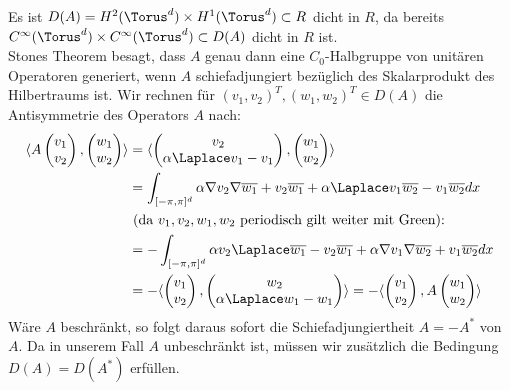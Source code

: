 Es ist $D(A)=H^2(\Torus^d)\times H^1(\Torus^d)\subset R$ dicht in $R$, da bereits $C^\infty(\Torus^d)\times C^\infty(\Torus^d)\subset D(A)$ dicht in $R$ ist.\\
Stones Theorem besagt, dass $A$ genau dann eine $C_0$-Halbgruppe von unitären Operatoren generiert, wenn $A$ schiefadjungiert bezüglich des Skalarprodukt des Hilbertraums ist. Wir rechnen für $(v_1,v_2)^T, (w_1,w_2)^T\in D(A)$ die Antisymmetrie des Operators $A$ nach:
\begin{align*}
\langle A\begin{pmatrix}v_1\\v_2\end{pmatrix}, \begin{pmatrix}w_1\\w_2\end{pmatrix}\rangle
&=\langle \begin{pmatrix} v_2\\\alpha \Laplace v_1-v_1\end{pmatrix}, \begin{pmatrix}w_1\\w_2\end{pmatrix}\rangle\\
&=\int_{[-\pi,\pi]^d} \alpha \nabla v_2\nabla \overline{w_1} +v_2\overline{w_1}+ \alpha \Laplace v_1 \overline{w_2} - v_1\overline{w_2}dx\\
&\text{ (da $v_1,v_2,w_1,w_2$ periodisch gilt weiter mit Green):}\\
&=-\int_{[-\pi,\pi]^d}\alpha v_2\Laplace \overline{w_1}-v_2\overline{w_1}+ \alpha \nabla v_1\nabla \overline{w_2} + v_1\overline{w_2}dx\\
&=-\langle \begin{pmatrix} v_1\\ v_2\end{pmatrix}, \begin{pmatrix} w_2\\\alpha \Laplace w_1-w_1\end{pmatrix}\rangle=-\langle \begin{pmatrix}v_1\\v_2\end{pmatrix}, A\begin{pmatrix}w_1\\w_2\end{pmatrix}\rangle
\end{align*}
Wäre $A$ beschränkt, so folgt daraus sofort die Schiefadjungiertheit $A=-A^*$ von $A$. Da in unserem Fall $A$ unbeschränkt ist, müssen wir zusätzlich die Bedingung $D(A)=D(A^*)$ erfüllen.\\
